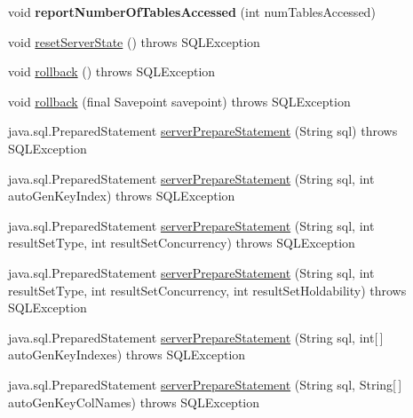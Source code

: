 \begin{DoxyCompactItemize}
void {\bfseries report\+Number\+Of\+Tables\+Accessed} (int num\+Tables\+Accessed)
\item 
void \mbox{\hyperlink{classcom_1_1mysql_1_1jdbc_1_1_connection_impl_a1335fc09ccb7954de9bffc4b59a489aa}{reset\+Server\+State}} ()  throws S\+Q\+L\+Exception 
\item 
void \mbox{\hyperlink{classcom_1_1mysql_1_1jdbc_1_1_connection_impl_a62b6461dc72ef3c739da196995cb9786}{rollback}} ()  throws S\+Q\+L\+Exception 
\item 
void \mbox{\hyperlink{classcom_1_1mysql_1_1jdbc_1_1_connection_impl_a2e3bce3038d1c58eedcfdfe49c82f904}{rollback}} (final Savepoint savepoint)  throws S\+Q\+L\+Exception 
\item 
java.\+sql.\+Prepared\+Statement \mbox{\hyperlink{classcom_1_1mysql_1_1jdbc_1_1_connection_impl_a32bbaa44990d6c0094b9697bf298bb60}{server\+Prepare\+Statement}} (String sql)  throws S\+Q\+L\+Exception 
\item 
java.\+sql.\+Prepared\+Statement \mbox{\hyperlink{classcom_1_1mysql_1_1jdbc_1_1_connection_impl_a03fa01b17c7f7166c578fcd596fb9a8a}{server\+Prepare\+Statement}} (String sql, int auto\+Gen\+Key\+Index)  throws S\+Q\+L\+Exception 
\item 
java.\+sql.\+Prepared\+Statement \mbox{\hyperlink{classcom_1_1mysql_1_1jdbc_1_1_connection_impl_af4efc83e3fa843f0acaa4bc786d42237}{server\+Prepare\+Statement}} (String sql, int result\+Set\+Type, int result\+Set\+Concurrency)  throws S\+Q\+L\+Exception 
\item 
java.\+sql.\+Prepared\+Statement \mbox{\hyperlink{classcom_1_1mysql_1_1jdbc_1_1_connection_impl_afda4b5397a3241273af80d0ba702c6a0}{server\+Prepare\+Statement}} (String sql, int result\+Set\+Type, int result\+Set\+Concurrency, int result\+Set\+Holdability)  throws S\+Q\+L\+Exception 
\item 
java.\+sql.\+Prepared\+Statement \mbox{\hyperlink{classcom_1_1mysql_1_1jdbc_1_1_connection_impl_a47beacf4b3a8a745c22fb6f1cd7b8e60}{server\+Prepare\+Statement}} (String sql, int\mbox{[}$\,$\mbox{]} auto\+Gen\+Key\+Indexes)  throws S\+Q\+L\+Exception 
\item 
java.\+sql.\+Prepared\+Statement \mbox{\hyperlink{classcom_1_1mysql_1_1jdbc_1_1_connection_impl_a8bfab236948ec5c7432306cf7eebfd12}{server\+Prepare\+Statement}} (String sql, String\mbox{[}$\,$\mbox{]} auto\+Gen\+Key\+Col\+Names)  throws S\+Q\+L\+Exception 
\item 
\mbox{\label{classcom_1_1mysql_1_1jdbc_1_1_connection_impl_af03f9224a0d02c983722fcbd70ad60b0}} 

\end{DoxyCompactItemize}

